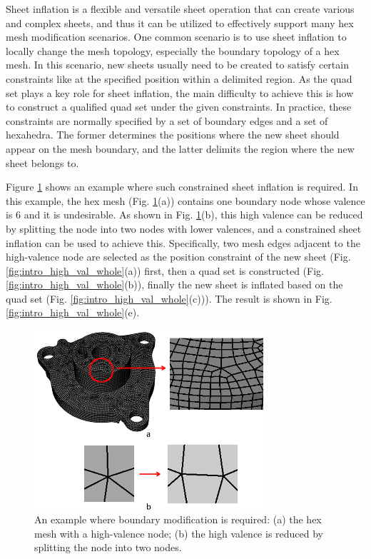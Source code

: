 \documentclass[final,5p,times,twocolumn]{elsarticle}
\begin{document}
Sheet inflation is a flexible and versatile sheet operation that can create various and complex sheets, and thus it can be utilized to effectively support many hex mesh modification scenarios. One common scenario is to use sheet inflation to locally change the mesh topology, especially the boundary topology of a hex mesh. In this scenario, new sheets usually need to be created to satisfy certain constraints like at the specified position within a delimited region. As the quad set plays a key role for sheet inflation, the main difficulty to achieve this is how to construct a qualified quad set under the given constraints. In practice, these constraints are normally specified by a set of boundary edges and a set of hexahedra. The former determines the positions where the new sheet should appear on the mesh boundary, and the latter delimits the region where the new sheet belongs to.

Figure \ref{fig:intro_high_val} shows an example where such constrained sheet inflation is required. In this example, the hex mesh (Fig. \ref{fig:intro_high_val}(a)) contains one boundary node whose valence is 6 and it is undesirable. As shown in Fig. \ref{fig:intro_high_val}(b), this high valence can be reduced by splitting the node into two nodes with lower valences, and a constrained sheet inflation can be used to achieve this. Specifically, two mesh edges adjacent to the high-valence node are selected as the position constraint of the new sheet (Fig. \ref{fig:intro_high_val_whole}(a)) first, then a quad set is constructed (Fig. \ref{fig:intro_high_val_whole}(b)), finally the new sheet is inflated based on the quad set (Fig. \ref{fig:intro_high_val_whole}(c))). The result is shown in Fig. \ref{fig:intro_high_val_whole}(e).

\begin{figure}[htbp]
\begin{center}
\includegraphics[width=8.5cm]{rev_figures/intro_high_val.png}
\caption{An example where boundary modification is required: (a) the hex mesh with a high-valence node; (b) the high valence is reduced by splitting the node into two nodes.}
\label{fig:intro_high_val}
\end{center}
\end{figure}
\end{document}
